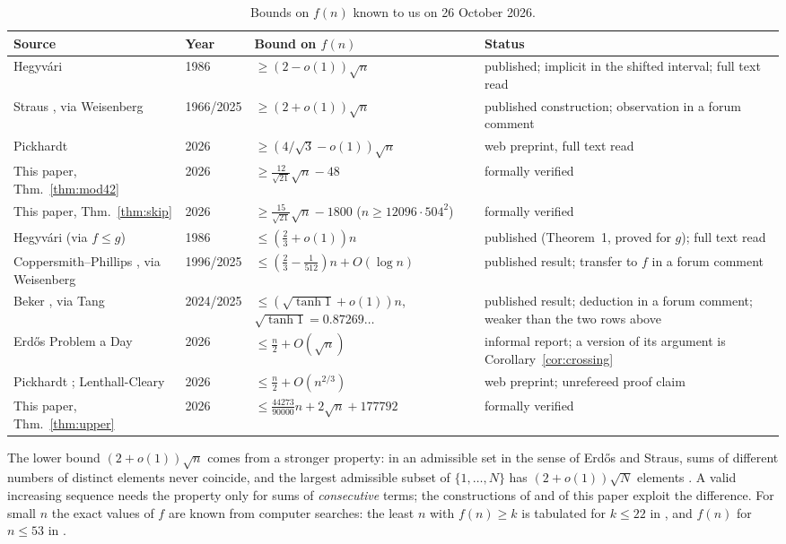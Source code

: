 \documentclass[11pt]{amsart}
\theoremstyle{remark}
\begin{document}
\begin{table}[ht]
\centering
\small
\renewcommand{\arraystretch}{1.15}
\begin{tabular}{@{}>{\raggedright}p{3.7cm}l>{\raggedright}p{3.9cm}>{\raggedright\arraybackslash}p{3.4cm}@{}}
\toprule
Source & Year & Bound on $f(n)$ & Status\\
\midrule
Hegyv\'ari \cite[Thm.~2]{Hegyvari1986} & 1986 & $\ge(2-o(1))\sqrt n$ & published; implicit in the shifted interval; full text read\\
Straus \cite{Straus1966}, via Weisenberg \cite{EP357forum} & 1966/2025 & $\ge(2+o(1))\sqrt n$ & published construction; observation in a forum comment\\
Pickhardt \cite{Pickhardt2026} & 2026 & $\ge(4/\sqrt3-o(1))\sqrt n$ & web preprint, full text read\\
This paper, Thm.~\ref{thm:mod42} & 2026 & $\ge\frac{12}{\sqrt{21}}\sqrt n-48$ & formally verified\\
This paper, Thm.~\ref{thm:skip} & 2026 & $\ge\frac{15}{\sqrt{21}}\sqrt n-1800$ ($n\ge12096\cdot504^2$) & formally verified\\
\midrule
Hegyv\'ari \cite{Hegyvari1986} (via $f\le g$) & 1986 & $\le(\frac23+o(1))n$ & published (Theorem~1, proved for $g$); full text read\\
Coppersmith--Phillips \cite{CoppersmithPhillips1996}, via Weisenberg \cite{EP357forum} & 1996/2025 & $\le(\frac23-\frac1{512})n+O(\log n)$ & published result; transfer to $f$ in a forum comment\\
Beker \cite{Beker2024}, via Tang \cite{EP357forum} & 2024/2025 & $\le(\sqrt{\tanh 1}+o(1))n$, $\sqrt{\tanh1}=0.87269\ldots$ & published result; deduction in a forum comment; weaker than the two rows above\\
Erd\H{o}s Problem a Day \cite{EPDay2026} & 2026 & $\le \frac n2+O(\sqrt n)$ & informal report; a version of its argument is Corollary~\ref{cor:crossing}\\
Pickhardt \cite{Pickhardt2026}; Lenthall-Cleary \cite{EP357claims} & 2026 & $\le \frac n2+O(n^{2/3})$ & web preprint; unrefereed proof claim\\
This paper, Thm.~\ref{thm:upper} & 2026 & $\le\frac{44273}{90000}n+2\sqrt n+177792$ & formally verified\\
\bottomrule
\end{tabular}
\caption{Bounds on $f(n)$ known to us on 26 October 2026.}
\label{tab:lit}
\end{table}

The lower bound $(2+o(1))\sqrt n$ comes from a stronger property: in an admissible set in the sense of Erd\H{o}s and Straus, sums of
different numbers of distinct elements never coincide, and the largest admissible subset of $\{1,\dots,N\}$ has $(2+o(1))\sqrt N$
elements \cite{Straus1966,DeshouillersFreiman1995,DeshouillersFreiman1999,EP874}. A valid increasing sequence needs the property only
for sums of \emph{consecutive} terms; the constructions of \cite{Pickhardt2026} and of this paper exploit the difference. For small
$n$ the exact values of $f$ are known from computer searches: the least $n$ with $f(n)\ge k$ is tabulated for $k\le22$ in
\cite{OEISA364132}, and $f(n)$ for $n\le53$ in \cite{chy4pro}.
\end{document}
